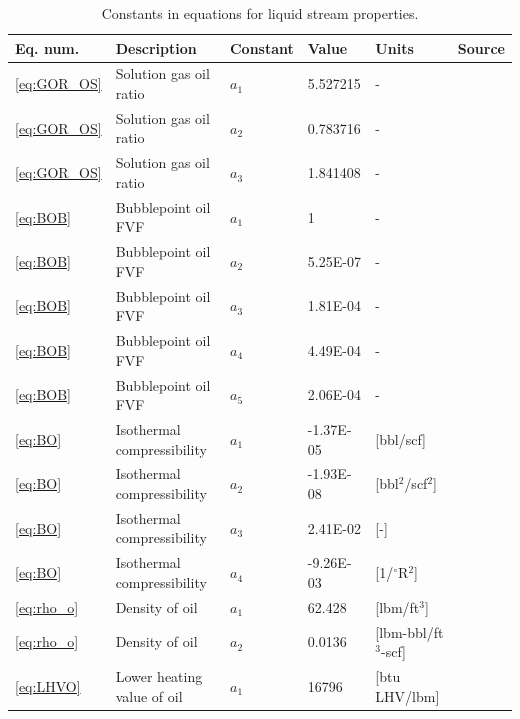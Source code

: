 \documentclass[11pt]{report}
\begin{document}
\begin{table}
\begin{scriptsize}
\caption{Constants in equations for liquid stream properties.}
\label{tab:ConstantsLiquidFlowSheet}
\begin{tabularx}{1\columnwidth}{p{}p{}p{}p{}p{}p{}}
\toprule
Eq. num. 			& Description	 			& Constant		& Value  		& Units		& Source \\
\midrule
\ref{eq:GOR_OS}	& Solution gas oil ratio		& $a_1$		& 5.527215	& -			& \cite{Alshammasi2001} \\
\ref{eq:GOR_OS}	& Solution gas oil ratio		& $a_2$		& 0.783716	& -			& \cite{Alshammasi2001} \\
\ref{eq:GOR_OS}	& Solution gas oil ratio		& $a_3$		& 1.841408	& -			& \cite{Alshammasi2001} \\
\midrule
\ref{eq:BOB}		& Bubblepoint oil FVF		& $a_1$		& 1			& -			& \cite{Alshammasi2001} \\
\ref{eq:BOB}		& Bubblepoint oil FVF		& $a_2$		& 5.25E-07	& -			& \cite{Alshammasi2001} \\
\ref{eq:BOB}		& Bubblepoint oil FVF		& $a_3$		& 1.81E-04	& -			& \cite{Alshammasi2001} \\
\ref{eq:BOB}		& Bubblepoint oil FVF		& $a_4$		& 4.49E-04	& -			& \cite{Alshammasi2001} \\
\ref{eq:BOB}		& Bubblepoint oil FVF		& $a_5$		& 2.06E-04	& -			& \cite{Alshammasi2001} \\
\midrule
\ref{eq:BO}		& Isothermal compressibility	& $a_1$		& -1.37E-05	& [bbl/scf]			& \cite{Almarhoun1992} \\
\ref{eq:BO}		& Isothermal compressibility	& $a_2$		& -1.93E-08	& [bbl$^2$/scf$^2$]			& \cite{Almarhoun1992} \\
\ref{eq:BO}		& Isothermal compressibility	& $a_3$		& 2.41E-02	& [-]			& \cite{Almarhoun1992} \\
\ref{eq:BO}		& Isothermal compressibility	& $a_4$		& -9.26E-03	& [1/$^\circ$R$^2$]			& \cite{Almarhoun1992} \\
\midrule
\ref{eq:rho_o}		& Density of oil				& $a_1$		& 62.428		& [lbm/ft$^3$]			& \cite{Fanchi2007} \\
\ref{eq:rho_o}		& Density of oil				& $a_2$		& 0.0136		& [lbm-bbl/ft$^3$-scf]			& \cite{Fanchi2007} \\
\midrule
\ref{eq:LHVO}		& Lower heating value of oil	& $a_1$		& 16796		& [btu LHV/lbm]	 & \cite{API1997} \\

\end{tabularx}
\end{scriptsize}
\end{table}
\end{document}
